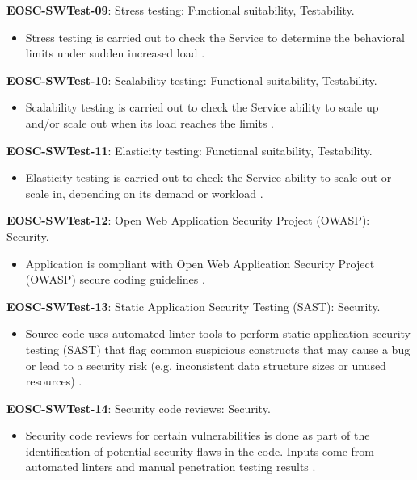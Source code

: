 \textbf{EOSC-SWTest-09}: Stress testing: Functional suitability, Testability.

\begin{itemize}
    \item Stress testing is carried out to check the Service to determine the behavioral limits under sudden increased load \cite{orviz_fernandez_eosc-synergy_2020}.
\end{itemize}

\textbf{EOSC-SWTest-10}: Scalability testing: Functional suitability, Testability.

\begin{itemize}
    \item Scalability testing is carried out to check the Service ability to scale up and/or scale out when its load reaches the limits \cite{orviz_fernandez_eosc-synergy_2020}.
\end{itemize}

\textbf{EOSC-SWTest-11}: Elasticity testing: Functional suitability, Testability.

\begin{itemize}
    \item Elasticity testing is carried out to check the Service ability to scale out or scale in, depending on its demand or workload \cite{orviz_fernandez_eosc-synergy_2020}.
\end{itemize}

\textbf{EOSC-SWTest-12}: Open Web Application Security Project (OWASP): Security.

\begin{itemize}
    \item Application is compliant with Open Web Application Security Project (OWASP) secure coding guidelines \cite{orviz_set_2017}.
\end{itemize}

\textbf{EOSC-SWTest-13}: Static Application Security Testing (SAST): Security.

\begin{itemize}
    \item Source code uses automated linter tools to perform static application security testing (SAST) that flag common suspicious constructs that may cause a bug or lead to a security risk (e.g. inconsistent data structure sizes or unused resources) \cite{orviz_set_2017}.
\end{itemize}

\textbf{EOSC-SWTest-14}: Security code reviews: Security.

\begin{itemize}
    \item Security code reviews for certain vulnerabilities is done as part of the identification of potential security flaws in the code. Inputs  come from automated linters and manual penetration testing results \cite{gillies_modelling_1992,shepherdson_cessda_2019,orviz_set_2017}.
\end{itemize}


